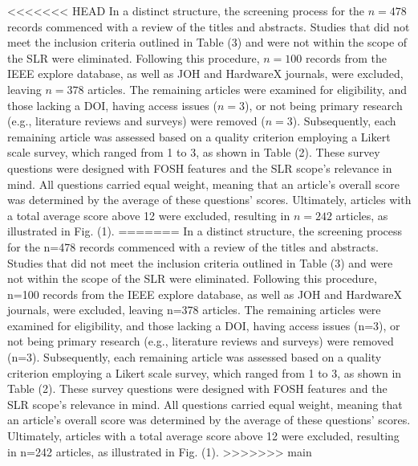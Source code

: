 \documentclass[final-report.tex]{subfiles}
\begin{document}
<<<<<<< HEAD
In a distinct structure, the screening process for the $n=478$ records commenced with a review of the titles and abstracts. Studies that did not meet the inclusion criteria outlined in Table (3) and were not within the scope of the SLR were eliminated. Following this procedure, $n=100$ records from the IEEE explore database, as well as JOH and HardwareX journals, were excluded, leaving $n=378$ articles. The remaining articles were examined for eligibility, and those lacking a DOI, having access issues ($n=3$), or not being primary research (e.g., literature reviews and surveys) were removed ($n=3$). Subsequently, each remaining article was assessed based on a quality criterion employing a Likert scale survey, which ranged from 1 to 3, as shown in Table (2). These survey questions were designed with FOSH features and the SLR scope's relevance in mind. All questions carried equal weight, meaning that an article's overall score was determined by the average of these questions' scores. Ultimately, articles with a total average score above 12 were excluded, resulting in $n=242$ articles, as illustrated in Fig. (1).
=======
In a distinct structure, the screening process for the n=478 records commenced with a review of the titles and abstracts. 
Studies that did not meet the inclusion criteria outlined in Table (3) and were not within the scope of the SLR were eliminated. 
Following this procedure, n=100 records from the IEEE explore database, as well as JOH and HardwareX journals, were excluded, leaving n=378 articles. 
The remaining articles were examined for eligibility, and those lacking a DOI, having access issues (n=3), or not being primary research (e.g., literature reviews and surveys) were removed (n=3). 
Subsequently, each remaining article was assessed based on a quality criterion employing a Likert scale survey, which ranged from 1 to 3, as shown in Table (2). 
These survey questions were designed with FOSH features and the SLR scope's relevance in mind. 
All questions carried equal weight, meaning that an article's overall score was determined by the average of these questions' scores. 
Ultimately, articles with a total average score above 12 were excluded, resulting in n=242 articles, as illustrated in Fig. (1).
>>>>>>> main
\end{document}
